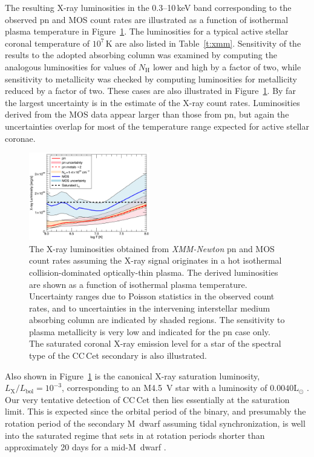 \documentclass[fleqn,usenatbib]{mnras}
\begin{document}
The resulting X-ray luminosities in the 0.3--10\,keV band corresponding to the  observed pn and MOS count rates are illustrated as a function of isothermal plasma temperature in Figure~\ref{f:xmmlx}. The  luminosities for a typical active stellar coronal temperature of $10^7$\,K are also listed in Table~\ref{t:xmm}. Sensitivity of the results to the adopted absorbing column was examined by computing the analogous luminosities for values of $N_\mathrm{H}$ lower and high by a factor of two, while sensitivity to metallicity was checked by computing luminosities for metallicity reduced by a factor of two. These cases are also illustrated in Figure~\ref{f:xmmlx}.  By far the largest uncertainty is in the estimate of the X-ray count rates. Luminosities derived from the MOS data appear larger than those from pn, but again the uncertainties overlap for most of the temperature range expected for active stellar coronae.

\begin{figure}
    \centering
    \includegraphics[width=0.47\textwidth]{cccet.png}
    \caption{The X-ray luminosities obtained from {\it XMM-Newton} pn and MOS count rates assuming the X-ray signal originates in a hot isothermal  collision-dominated  optically-thin plasma. The derived luminosities are shown as a function of isothermal plasma temperature. Uncertainty ranges due to Poisson statistics in the observed count rates, and to uncertainties in the intervening interstellar medium absorbing column are indicated by shaded regions. The sensitivity to plasma metallicity is very low and indicated for the pn case only. The saturated coronal X-ray emission level for a star of the spectral type of the CC\,Cet secondary is also illustrated.}
    \label{f:xmmlx}
\end{figure}

Also shown in Figure~\ref{f:xmmlx} is the canonical X-ray saturation luminosity, $L_\mathrm{X}/L_\mathrm{bol}=10^{-3}$, corresponding to an M4.5~V star with a luminosity of $0.0040\mathrm{L}_\odot$ \citep{pecaut+mamajek13-1}.  Our very tentative detection of CC\,Cet then lies essentially at the saturation limit.  This is expected since the orbital period of the binary, and presumably the rotation period of the secondary M~dwarf assuming tidal synchronization, is well into the saturated regime that sets in at rotation periods shorter than approximately 20 days for a mid-M~dwarf \citep[e.g.][]{Wright.etal:11}.
\end{document}
